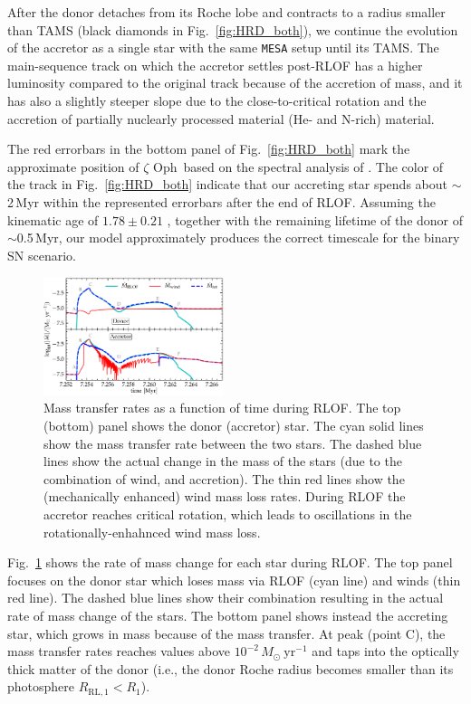 \documentclass[twocolumn,twocolappendix,trackchanges]{aastex63}
\DeclareRobustCommand{\Figref}[1]{Fig.~\ref{#1}}
\newcommand{\zoph}{$\zeta$ Oph}
\begin{document}
After the donor detaches from its Roche lobe and contracts to a radius smaller than TAMS (black diamonds in \Figref{fig:HRD_both}), we continue the evolution of the accretor as a single star with the same \texttt{MESA} setup until its TAMS. The main-sequence track on which the accretor settles post-RLOF has a higher luminosity compared to the original track because of the accretion of mass, and it has also a slightly steeper slope due to the close-to-critical rotation and the accretion of partially nuclearly processed material (He- and N-rich) material.

The red errorbars in the bottom panel of \Figref{fig:HRD_both} mark
the approximate position of \zoph\ based on the spectral analysis of
. The color of the track in
\Figref{fig:HRD_both} indicate that our accreting star spends about
$\sim$2\,Myr within the represented errorbars after the end of
RLOF. Assuming the kinematic age of $1.78\pm0.21$
\citep{neuhauser:20}, together with the remaining lifetime of the
donor of $\sim$0.5\,Myr, our model approximately produces the correct
timescale for the binary SN scenario.



\begin{figure}[htbp]
  \includegraphics[width=0.47\textwidth]{MT}
  \caption{Mass transfer rates as a function of time during RLOF. The top (bottom) panel
    shows the donor (accretor) star. The cyan solid lines show the
    mass transfer rate between the two stars. The dashed blue lines
    show the actual change in the mass of the stars (due to the
    combination of wind, and accretion). The thin red
    lines show the (mechanically enhanced) wind mass loss rates. During RLOF the accretor
    reaches critical rotation, which leads to oscillations in the
    rotationally-enhahnced wind mass loss.}
  \label{fig:MT}
\end{figure}

\Figref{fig:MT} shows the rate of mass change for each star during
RLOF. The top panel focuses on the donor star which loses mass via RLOF
(cyan line) and winds (thin red line). The dashed blue lines
show their combination resulting in the actual rate of mass change of
the stars. The bottom panel shows instead the accreting star, which
grows in mass because of the mass transfer. At peak (point C), the mass transfer
rates reaches values above
$10^{-2}\,M_\odot\ \mathrm{yr^{-1}}$ and taps into the optically
thick matter of the donor (i.e., the donor Roche radius becomes
smaller than its photosphere $R_\mathrm{RL,1}<R_1$).
\end{document}
